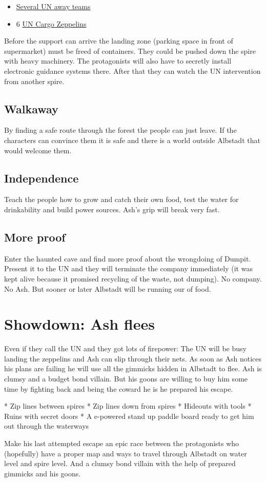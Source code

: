 \begin{itemize}
    \item \hyperref[sec: UN away team]{Several UN away teams}
    \item 6 \hyperref[sec: UN Cargo Zeppelins]{UN Cargo Zeppelins}
\end{itemize}

Before the support can arrive the landing zone (parking space in front of supermarket) must be freed of containers. They could be pushed down the spire with heavy machinery. The protagonists will also have to secretly install electronic guidance systems there. After that they can watch the UN intervention from another spire.

\subsection{Walkaway}

By finding a safe route through the forest the people can just leave. If the characters can convince them it is safe and there is a world outside Albstadt that would welcome them.

\subsection{Independence}

Teach the people how to grow and catch their own food, test the water for drinkability and build power sources. Ash's grip will break very fast.

\subsection{More proof}

Enter the haunted cave and find more proof about the wrongdoing of Dumpit. Present it to the UN and they will terminate the company immediately (it was kept alive because it promised recycling of the waste, not dumping). No company. No Ash. But sooner or later Albstadt will be running our of food.

\section{Showdown: Ash flees}
Even if they call the UN and they got lots of firepower: The UN will be busy landing the zeppelins and Ash can slip through their nets. As soon as Ash notices his plans are failing he will use all the gimmicks hidden in Albstadt to flee. Ash is clumsy and a budget bond villain. But his goons are willing to buy him some time by fighting back and being the coward he is he prepared his escape.

* Zip lines between spires
* Zip lines down from spires
* Hideouts with tools
* Ruins with secret doors
* A e-powered stand up paddle board ready to get him out through the waterways

Make his last attempted escape an epic race between the protagonists who (hopefully) have a proper map and ways to travel through Albstadt on water level and spire level. And a clumsy bond villain with the help of prepared gimmicks and his goons.
